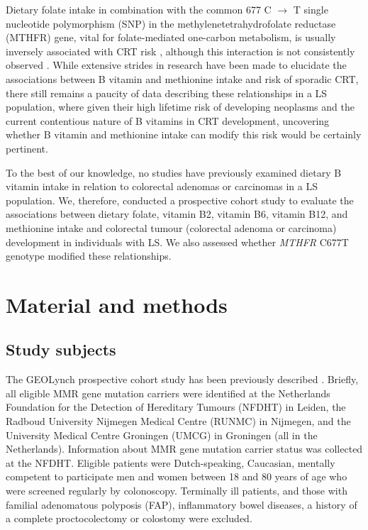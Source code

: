\noindent Dietary folate intake in combination with the common 677 C $\rightarrow$ T single nucleotide polymorphism (SNP) in the methylenetetrahydrofolate reductase (MTHFR) gene, vital for folate-mediated one-carbon metabolism, is usually inversely associated with CRT risk \cite{c624,c625}, although this interaction is not consistently observed \cite{c621,c626,c627}. While extensive strides in research have been made to elucidate the associations between B vitamin and methionine intake and risk of sporadic CRT, there still remains a paucity of data describing these relationships in a LS population, where given their high lifetime risk of developing neoplasms and the current contentious nature of B vitamins in CRT development, uncovering whether B vitamin and methionine intake can modify this risk would be certainly pertinent.

\noindent To the best of our knowledge, no studies have previously examined dietary B vitamin intake in relation to colorectal adenomas or carcinomas in a LS population. We, therefore, conducted a prospective cohort study to evaluate the associations between dietary folate, vitamin B2, vitamin B6, vitamin B12, and methionine intake and colorectal tumour (colorectal adenoma or carcinoma) development in individuals with LS. We also assessed whether \emph{MTHFR} C677T genotype modified these relationships.

\section[]{Material and methods} %
\subsection{Study subjects} %
\noindent The GEOLynch prospective cohort study has been previously described \cite{c612}. Briefly, all eligible MMR gene mutation carriers were identified at the Netherlands Foundation for the Detection of Hereditary Tumours (NFDHT) in Leiden, the Radboud University Nijmegen Medical Centre (RUNMC) in Nijmegen, and the University Medical Centre Groningen (UMCG) in Groningen (all in the Netherlands). Information about MMR gene mutation carrier status was collected at the NFDHT. Eligible patients were Dutch-speaking, Caucasian, mentally competent to participate men and women between 18 and 80 years of age who were screened regularly by colonoscopy. Terminally ill patients, and those with familial adenomatous polyposis (FAP), inflammatory bowel diseases, a history of a complete proctocolectomy or colostomy were excluded.

